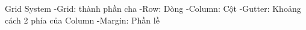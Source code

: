 Grid System
-Grid: thành phần cha
-Row: Dòng
-Column: Cột
-Gutter: Khoảng cách 2 phía của Column
-Margin: Phần lề